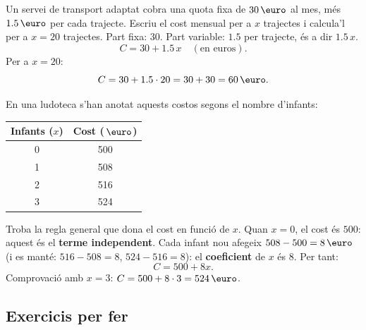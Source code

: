 \begin{exresolt}
Un servei de transport adaptat cobra una quota fixa de $\num{30}\eur$ al mes,
més $\num{1,5}\eur$ per cada trajecte. Escriu el cost mensual per a $x$ trajectes
i calcula'l per a $x=20$ trajectes.
\solucio
Part fixa: $30$. Part variable: $\num{1,5}$ per trajecte, és a dir $\num{1,5}\,x$.
\[
C = 30 + \num{1,5}\,x \quad(\text{en euros}).
\]
Per a $x=20$:
\[
C = 30 + \num{1,5}\per 20 = 30 + 30 = 60\eur.
\]
\end{exresolt}

\begin{exresolt}
En una ludoteca s'han anotat aquests costos segons el nombre d'infants:

\begin{center}
\begin{tabular}{c c}
\toprule
Infants ($x$) & Cost ($\eur$) \\
\midrule
0 & 500 \\
1 & 508 \\
2 & 516 \\
3 & 524 \\
\bottomrule
\end{tabular}
\end{center}

Troba la regla general que dona el cost en funció de $x$.
\solucio
Quan $x=0$, el cost és $500$: aquest és el \textbf{terme independent}.
Cada infant nou afegeix $508-500=8\eur$ (i es manté: $516-508=8$, $524-516=8$):
el \textbf{coeficient} de $x$ és $8$. Per tant:
\[
C = 500 + 8x.
\]
Comprovació amb $x=3$: $C=500+8\per 3 = 524\eur$. \checkmark
{}
\end{exresolt}

\subsection{Exercicis per fer}

